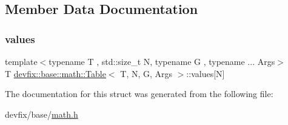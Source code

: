 \subsection{Member Data Documentation}
\mbox{\label{structdevfix_1_1base_1_1math_1_1Table_a62c83a19d69fec924a3db9bc5bcc4777}} 
\subsubsection{\texorpdfstring{values}{values}}
{\footnotesize\ttfamily template$<$typename T , std\+::size\+\_\+t N, typename G , typename ... Args$>$ \\
T \hyperlink{structdevfix_1_1base_1_1math_1_1Table}{devfix\+::base\+::math\+::\+Table}$<$ T, N, G, Args $>$\+::values\mbox{[}N\mbox{]}}



The documentation for this struct was generated from the following file\+:\begin{DoxyCompactItemize}
\item 
devfix/base/\hyperlink{math_8h}{math.\+h}\end{DoxyCompactItemize}
